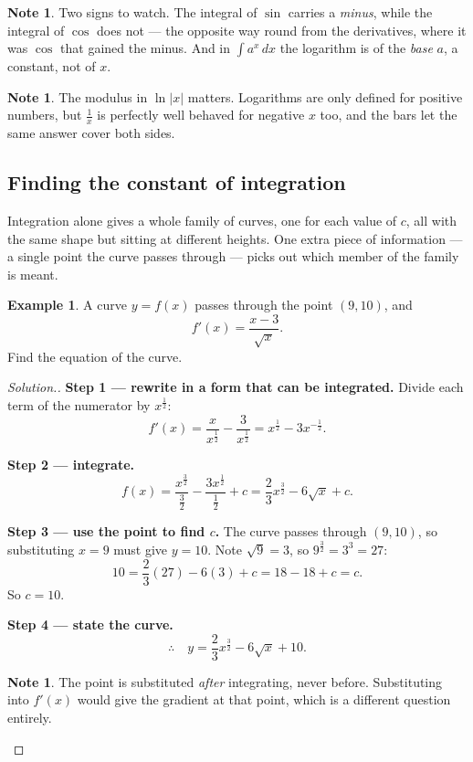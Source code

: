 \documentclass[11pt,a4paper]{article}
\theoremstyle{definition}
\newtheorem{example}[thm]{Example}
\newtheorem{note}[thm]{Note}
\newenvironment{solution}
  {\renewcommand{\qedsymbol}{}\begin{proof}[\textit{Solution}.]}
  {\end{proof}}
\begin{document}
\begin{note}
Two signs to watch. The integral of $\sin$ carries a \emph{minus}, while the integral of
$\cos$ does not --- the opposite way round from the derivatives, where it was $\cos$ that
gained the minus. And in $\int a^x\,dx$ the logarithm is of the \emph{base} $a$, a
constant, not of $x$.
\end{note}

\begin{note}
The modulus in $\ln|x|$ matters. Logarithms are only defined for positive numbers, but
$\frac{1}{x}$ is perfectly well behaved for negative $x$ too, and the bars let the same
answer cover both sides.
\end{note}

\subsection{Finding the constant of integration}

Integration alone gives a whole family of curves, one for each value of $c$, all with
the same shape but sitting at different heights. One extra piece of information --- a
single point the curve passes through --- picks out which member of the family is meant.

\begin{example}
A curve $y=f(x)$ passes through the point $(9,10)$, and
$$f'(x)=\frac{x-3}{\sqrt{x}}.$$
Find the equation of the curve.
\end{example}

\begin{solution}
\textbf{Step 1 --- rewrite in a form that can be integrated.} Divide each term of the
numerator by $x^{\frac{1}{2}}$:
$$f'(x)=\frac{x}{x^{\frac{1}{2}}}-\frac{3}{x^{\frac{1}{2}}}
=x^{\frac{1}{2}}-3x^{-\frac{1}{2}}.$$

\textbf{Step 2 --- integrate.}
$$f(x)=\frac{x^{\frac{3}{2}}}{\frac{3}{2}}-\frac{3x^{\frac{1}{2}}}{\frac{1}{2}}+c
=\frac{2}{3}x^{\frac{3}{2}}-6\sqrt{x}+c.$$

\textbf{Step 3 --- use the point to find $c$.} The curve passes through $(9,10)$, so
substituting $x=9$ must give $y=10$. Note $\sqrt{9}=3$, so
$9^{\frac{3}{2}}=3^3=27$:
$$10=\frac{2}{3}(27)-6(3)+c=18-18+c=c.$$
So $c=10$.

\textbf{Step 4 --- state the curve.}
$$\therefore\quad y=\frac{2}{3}x^{\frac{3}{2}}-6\sqrt{x}+10.$$

\begin{note}
The point is substituted \emph{after} integrating, never before. Substituting into
$f'(x)$ would give the gradient at that point, which is a different question entirely.
\end{note}
\end{solution}
\end{document}
